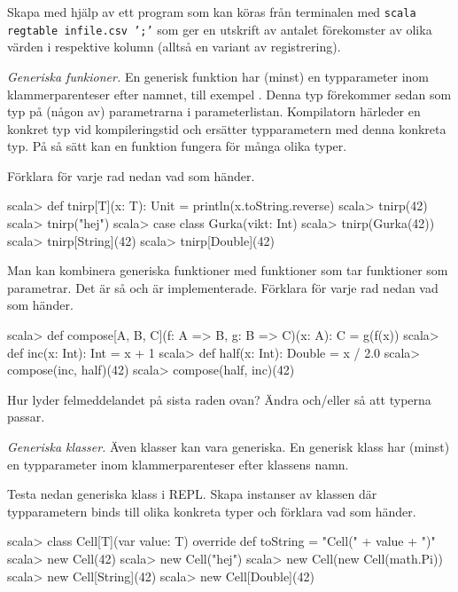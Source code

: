 \Subtask Skapa med hjälp av  ett program som kan köras från terminalen med \texttt{scala regtable infile.csv ';'} som ger en utskrift av antalet förekomster av olika värden i respektive kolumn (alltså en variant av registrering).


\Task \emph{Generiska funkioner.} En generisk funktion har (minst) en typparameter inom klammerparenteser efter namnet, till exempel \code{[T]}. Denna typ förekommer sedan som typ på (någon av) parametrarna i parameterlistan. Kompilatorn härleder en konkret typ vid kompileringstid och ersätter typparametern med denna konkreta typ. På så sätt kan en funktion fungera för många olika typer. 

\Subtask Förklara för varje rad nedan vad som händer.

\begin{REPL}
scala> def tnirp[T](x: T): Unit = println(x.toString.reverse)
scala> tnirp(42)
scala> tnirp("hej")
scala> case class Gurka(vikt: Int)
scala> tnirp(Gurka(42))
scala> tnirp[String](42)
scala> tnirp[Double](42)
\end{REPL}

\Subtask Man kan kombinera generiska funktioner med funktioner som tar funktioner som parametrar. Det är så  och  är implementerade. Förklara för varje rad nedan vad som händer.

\begin{REPL}
scala> def compose[A, B, C](f: A => B, g: B => C)(x: A): C = g(f(x))
scala> def inc(x: Int): Int = x + 1
scala> def half(x: Int): Double = x / 2.0
scala> compose(inc, half)(42)
scala> compose(half, inc)(42)
\end{REPL}

\Subtask Hur lyder felmeddelandet på sista raden ovan? Ändra  och/eller  så att typerna passar.


\Task \emph{Generiska klasser.} Även klasser kan vara generiska. En generisk klass har (minst) en typparameter inom klammerparenteser efter klassens namn. 

\Subtask Testa nedan generiska klass  i REPL. Skapa instanser av klassen  där typparametern  binds till olika konkreta typer och förklara vad som händer.

\begin{REPL}
scala> class Cell[T](var value: T){
         override def toString = "Cell(" + value + ")"
       }
scala> new Cell(42)
scala> new Cell("hej")
scala> new Cell(new Cell(math.Pi))
scala> new Cell[String](42)
scala> new Cell[Double](42)
\end{REPL}

